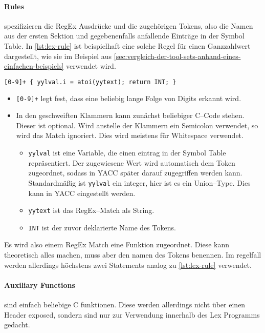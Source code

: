 \paragraph{Rules} spezifizieren die \ac{RegEx} Ausdrücke und die zugehörigen Tokens, also die Namen aus der ersten Sektion und gegebenenfalls anfallende Einträge in der Symbol Table.
In \autoref{lst:lex-rule} ist beispielhaft eine solche Regel für einen Ganzzahlwert dargestellt, wie sie im Beispiel aus \autoref{sec:vergleich-der-tool-sets-anhand-eines-einfachen-beispiels} verwendet wird.
\begin{lstlisting}[label={lst:lex-rule},caption={Lex Regel},language=lex]
[0-9]+ { yylval.i = atoi(yytext); return INT; }
\end{lstlisting}
\begin{itemize}
    \item \verb|[0-9]+| legt fest, dass eine beliebig lange Folge von Digits erkannt wird.
    \item In den geschweiften Klammern kann zunächst beliebiger C--Code stehen.
    Dieser ist optional.
    Wird anstelle der Klammern ein Semicolon verwendet, so wird das Match ignoriert.
    Dies wird meistens für Whitespace verwendet.
    \begin{itemize}
        \item \verb|yylval| ist eine Variable, die einen eintrag in der Symbol Table repräsentiert.
        Der zugewiesene Wert wird automatisch dem Token zugeordnet, sodass in \ac{YACC} später darauf zugegriffen werden kann.
        Standardmäßig ist \verb|yylval| ein integer, hier ist es ein Union--Type.
        Dies kann in \ac{YACC} eingestellt werden.
        \item \verb|yytext| ist das \acs{RegEx}--Match als String.
        \item \verb|INT| ist der zuvor deklarierte Name des Tokens.
    \end{itemize}
\end{itemize}

Es wird also einem \ac{RegEx} Match eine Funktion zugeordnet.
Diese kann theoretisch alles machen, muss aber den namen des Tokens benennen.
Im regelfall werden allerdings höchstens zwei Statements analog zu \autoref{lst:lex-rule} verwendet.

\paragraph{Auxiliary Functions} sind einfach beliebige C funktionen.
Diese werden allerdings nicht über einen Header exposed, sondern sind nur zur Verwendung innerhalb des Lex Programms gedacht.

